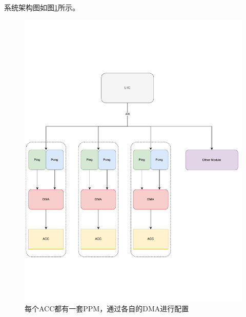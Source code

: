 \documentclass[a4paper, 12pt]{article}
\begin{document}
系统架构图如图\ref{fig:acc_ppm_dma}所示。
\begin{figure}
  \centering
  \includegraphics[width=\linewidth]{./images/acc_ppm_dma.pdf}
  \caption{每个ACC都有一套PPM，通过各自的DMA进行配置}
  \label{fig:acc_ppm_dma}
\end{figure}


\newpage 
\end{document}
